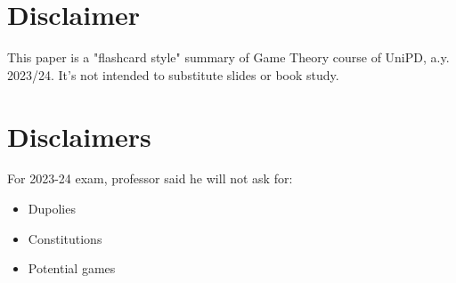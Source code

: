 \documentclass{article}
\begin{document}
\tableofcontents

\newpage
{} 

\section*{Disclaimer}
This paper is a "flashcard style" summary of Game Theory course of UniPD, a.y. 2023/24. It's not intended to substitute slides or book study.


\newpage

\newpage

\newpage

\newpage

\newpage

\newpage

\newpage

\newpage


\newpage

\newpage

\newpage

\newpage

\newpage

\newpage

\newpage

\newpage

\newpage

\newpage


\newpage




\newpage
\section{Disclaimers}
For 2023-24 exam, professor said he will not ask for:
\begin{itemize}
    \item Dupolies
    \item Constitutions
    \item Potential games
\end{itemize}
\end{document}

